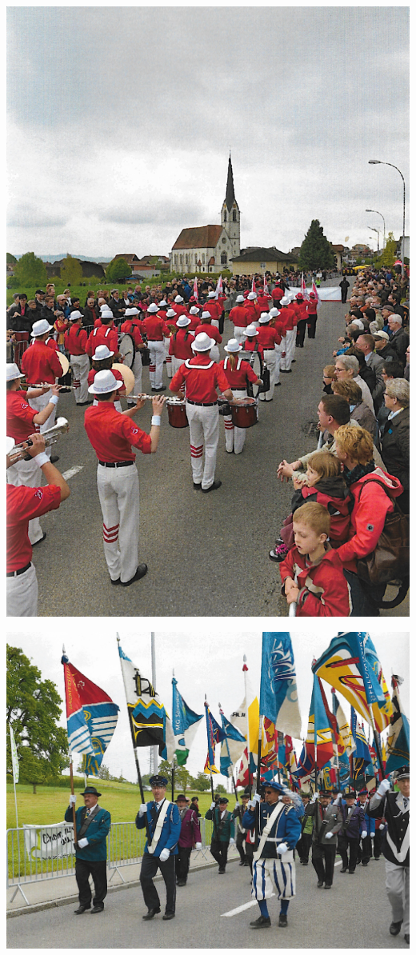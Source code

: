 \begin{history}
    \begin{MulticolFigure}
        \centering
        \includegraphics[width=0.7\linewidth]{./chap/2001-2024/2013/Showband-CH.jpg}
    \end{MulticolFigure}

    \begin{MulticolFigure}
        \centering
        \includegraphics[width=0.93\linewidth]{./chap/2001-2024/2013/Fahnendelegationen.jpg}
    \end{MulticolFigure}


\end{history}
